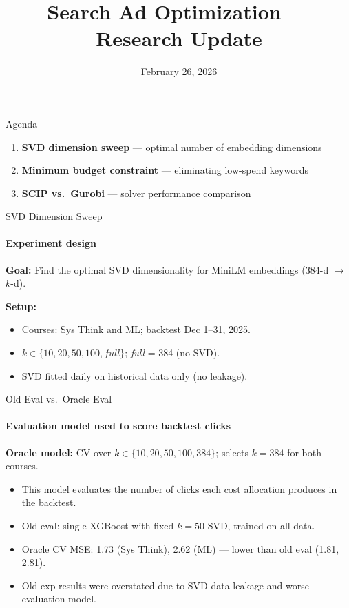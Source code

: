 \documentclass[smaller]{beamer}
\title{Search Ad Optimization --- Research Update}
\date{February 26, 2026}
\begin{document}
\begin{frame}
\titlepage
\end{frame}

\begin{frame}{Agenda}

\begin{enumerate}
    \item \textbf{SVD dimension sweep} --- optimal number of embedding dimensions
    \item \textbf{Minimum budget constraint} --- eliminating low-spend keywords
    \item \textbf{SCIP vs.\ Gurobi} --- solver performance comparison
\end{enumerate}

\end{frame}

\begin{frame}{SVD Dimension Sweep}
\framesubtitle{Experiment design}

\textbf{Goal:} Find the optimal SVD dimensionality for MiniLM embeddings (384-d $\to$ $k$-d).

\medskip
\textbf{Setup:}
\begin{itemize}
    \item Courses: Sys Think and ML; backtest Dec 1--31, 2025.
    \item $k \in \{10, 20, 50, 100, \textit{full}\}$; \textit{full} = 384 (no SVD).
    \item SVD fitted daily on historical data only (no leakage).
\end{itemize}

\end{frame}

\begin{frame}{Old Eval vs.\ Oracle Eval}
\framesubtitle{Evaluation model used to score backtest clicks}

\textbf{Oracle model:} CV over $k \in \{10, 20, 50, 100, 384\}$; selects $k{=}384$ for both courses.

\medskip
\begin{itemize}
    \item This model evaluates the number of clicks each cost allocation produces in the backtest.
    \item Old eval: single XGBoost with fixed $k{=}50$ SVD, trained on all data.
    \item Oracle CV MSE: 1.73 (Sys Think), 2.62 (ML) --- lower than old eval (1.81, 2.81).
    \item Old exp results were overstated due to SVD data leakage and worse evaluation model.
\end{itemize}

\end{frame}
\end{document}

